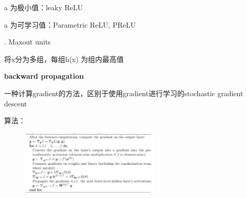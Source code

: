 \documentclass[UTF8]{ctexart}
\begin{document}
  \quad \quad \quad \quad a 为极小值：leaky ReLU

  \quad \quad \quad \quad a 为可学习值：Parametric ReLU, PReLU

  \quad {}. Maxout units

  \quad \quad \quad 将x分为多组，每组h(x) 为组内最高值

  \textbf{backward propagation}

  \quad 一种计算gradient的方法，区别于使用gradient进行学习的stochastic gradient descent

  \quad 算法：
  \begin{figure}[H] %
    \centering %
    \includegraphics[width=0.6\textwidth]{note_images/backprop_algo.png} %
  \end{figure}

  
\end{document}
